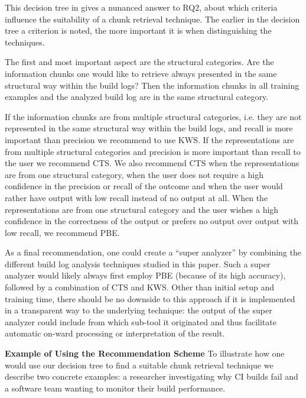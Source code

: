 This decision tree in  gives a nunanced
answer to RQ2, about which criteria influence the suitability of a
chunk retrieval technique.
The earlier in the decision tree a
criterion is noted, the more important it is when distinguishing the
techniques.

The first and most important aspect are the structural categories.
Are
the information chunks one would like to retrieve always presented in
the same structural way within the build logs? Then the information
chunks in all training examples and the analyzed build log are in the
same structural category.

If the information chunks are from multiple structural categories,
i.e.
they are not represented in the same structural way within the
build logs, and recall is more important than precision we recommend
to use KWS\@.
If the representations are from multiple structural
categories and precision is more important than recall to the user we
recommend CTS\@.
We also recommend CTS when the representations are
from one structural category, when the user does not require a high
confidence in the precision or recall of the outcome and when the user
would rather have output with low recall instead of no output at all.
When the representations are from one structural category and the user
wishes a high confidence in the correctness of the output or prefers
no output over output with low recall, we recommend PBE\@.

As a final recommendation, one could create a ``super analyzer'' by
combining the different build log analysis techniques studied in this
paper.
Such a super analyzer would likely always first employ PBE
(because of its high accuracy), followed by a combination of CTS and
KWS.
Other than initial setup and training time, there should be no
downside to this approach if it is implemented in a transparent way to
the underlying technique: the output of the super analyzer could
include from which sub-tool it originated and thus facilitate
automatic on-ward processing or interpretation of the result.


\noindent
\textbf{Example of Using the Recommendation Scheme}
To illustrate how one would use our decision tree to find a suitable
chunk retrieval technique we describe two concrete examples: a
researcher investigating why CI builds fail and a software team
wanting to monitor their build performance.


